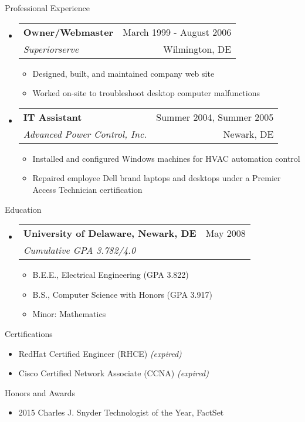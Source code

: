 \documentclass[letterpaper,10pt]{article}
\makeatletter
\newenvironment{ressection}[1]{
	\vspace{4pt}
	{\fontfamily{phv}\selectfont\Large#1}
	\begin{itemize}
	\vspace{3pt}
}{
	\end{itemize}
}
\newcommand{\resitem}[1]{
	\vspace{-4pt}
	\item \begin{flushleft} #1 \end{flushleft}
}
\newcommand{\ressubitem}[1]{
	\vspace{-1pt}
	\item \begin{flushleft} #1 \end{flushleft}
}
\newcommand{\resbigitem}[4]{
	\vspace{-5pt}
	\item
	\begin{tabular*}{6in}{l@{\extracolsep{\fill}}r}
		\textbf{#1} & #2 \\
		\textit{#3} & #4\\
	\end{tabular*}
}
\newenvironment{ressubsec}[4]{
	\resbigitem{#1}{#2}{#3}{#4}
	\vspace{-2pt}
	\begin{itemize}
}{
	\end{itemize}
}
\makeatother
\begin{document}
\begin{ressection}{Professional Experience}
	\begin{ressubsec}{Owner/Webmaster}{March 1999 - August 2006}{Superiorserve}{Wilmington, DE}
		\ressubitem{Designed, built, and maintained company web site}
		\ressubitem{Worked on-site to troubleshoot desktop computer malfunctions}
	\end{ressubsec}

	\begin{ressubsec}{IT Assistant}{Summer 2004, Summer 2005}{Advanced Power Control, Inc.}{Newark, DE}
		\ressubitem{Installed and configured Windows machines for HVAC automation control}
		\ressubitem{Repaired employee Dell brand laptops and desktops under a Premier Access Technician certification}
	\end{ressubsec}
\end{ressection}

\begin{ressection}{Education}
	\begin{ressubsec}{University of Delaware, Newark, DE}{May 2008}{Cumulative GPA 3.782/4.0}{}
		\ressubitem{B.E.E., Electrical Engineering (GPA 3.822)}
		\ressubitem{B.S., Computer Science with Honors (GPA 3.917)}
		\ressubitem{Minor: Mathematics}
	\end{ressubsec}
\end{ressection}

\begin{ressection}{Certifications}
	\resitem{RedHat Certified Engineer (RHCE) \textit{(expired)}}
	\resitem{Cisco Certified Network Associate (CCNA) \textit{(expired)}}
\end{ressection}

\begin{ressection}{Honors and Awards}
	\resitem{2015 Charles J. Snyder Technologist of the Year, FactSet}
\end{ressection}
\end{document}
